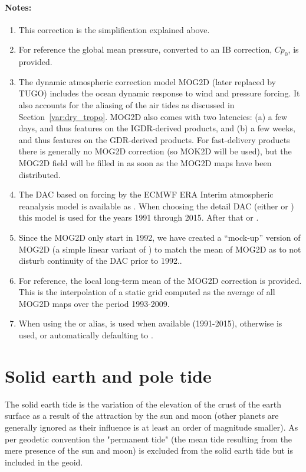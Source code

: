\documentclass[a4paper,11pt,openany,natbib,nomargin]{thesis}
\newenvironment{notes}[1][Notes:]{\FloatBarrier\paragraph{#1}\begin{enumerate}}{\end{enumerate}}
\begin{document}
\begin{notes}
\item This correction is the simplification explained above.\label{item:inv_bar_static}
\item For reference the global mean pressure, converted to an IB correction, $C p_0$, is provided.\label{item:inv_bar_global}
\item The dynamic atmospheric correction model MOG2D (later replaced by TUGO) includes the ocean dynamic response to wind and pressure forcing. It also accounts for the aliasing of the air tides as discussed in Section~\ref{var:dry_tropo}. MOG2D also comes with two latencies: (a) a few days, and thus features on the IGDR-derived products, and (b) a few weeks, and thus features on the GDR-derived products. For fast-delivery products there is generally no MOG2D correction (so MOK2D will be used), but the MOG2D field will be filled in as soon as the MOG2D maps have been distributed.\label{item:inv_bar_mog2d}
\item The DAC based on forcing by the ECMWF ERA Interim atmospheric reanalysis model is available as . When choosing the detail DAC (either  or ) this model is used for the years 1991 through 2015. After that  or .\label{item:inv_bar_mog2d_era}
\item Since the MOG2D only start in 1992, we have created a ``mock-up'' version of MOG2D (a simple linear variant of ) to match the mean of MOG2D as to not disturb continuity of the DAC prior to 1992.\label{item:inv_bar_mok2d}.
\item For reference, the local long-term mean of the MOG2D correction is provided. This is the interpolation of a static grid computed as the average of all MOG2D maps over the period 1993-2009.\label{item:inv_bar_mog2d_mean}
\item When using the  or  alias,  is used when available (1991-2015), otherwise  is used, or automatically defaulting to .\label{item:inv_bar}\label{item:dac}
\end{notes}

\section{Solid earth and pole tide}
\label{var:tide_solid}\label{var:tide_pole}
The solid earth tide is the variation of the elevation of the crust of the earth surface as a result of the attraction by the sun and moon (other planets are generally ignored as their influence is at least an order of magnitude smaller). As per geodetic convention the "permanent tide" (the mean tide resulting from the mere presence of the sun and moon) is excluded from the solid earth tide but is included in the geoid.
\end{document}
